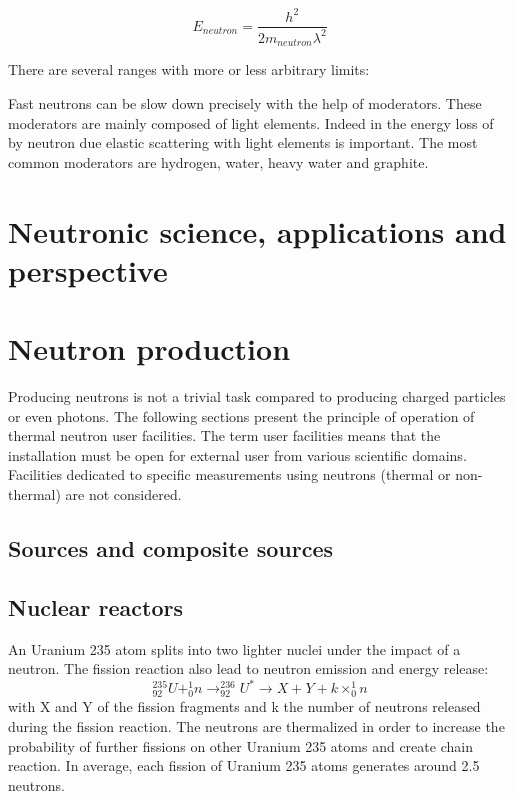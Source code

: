 \begin{refsection}
  \begin{equation*}
    E_{neutron} = \frac{h^{2}}{2m_{neutron}\lambda^{2}}
  \end{equation*}

  There are several ranges with more or less arbitrary limits:

  

  Fast neutrons can be slow down precisely with the help of moderators. These moderators are mainly composed of light elements. Indeed in the energy loss of by neutron due elastic scattering with light elements is important. The most common moderators are hydrogen, water, heavy water and graphite.


  \section{Neutronic science, applications and perspective}
  
  

  \section{Neutron production}
  Producing neutrons is not a trivial task compared to producing charged particles or even photons. The following sections present the principle of operation of thermal neutron user facilities. The term user facilities means that the installation must be open for external user from various scientific domains. Facilities dedicated to specific measurements using neutrons (thermal or non-thermal) are not considered.

  \subsection{Sources and composite sources}



  \subsection{Nuclear reactors}
  An Uranium 235 atom splits into two lighter nuclei under the impact of a neutron. The fission reaction also lead to neutron emission and energy release:
  \begin{equation*}
    _{92}^{235}U + _{0}^{1}n \rightarrow _{92}^{236}U^* \rightarrow X + Y + k \times _{0}^{1}n
  \end{equation*}
  with X and Y of the fission fragments and k the number of neutrons released during the fission reaction. The neutrons are thermalized in order to increase the probability of further fissions on other Uranium 235 atoms and create chain reaction. In average, each fission of Uranium 235 atoms generates around 2.5 neutrons.


\end{refsection}
